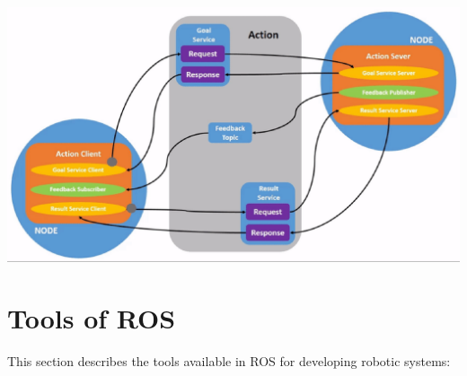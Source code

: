 \begin{itemize}
	\begin{center}
		\captionsetup{type=figure}
		\includegraphics[width=0.6\linewidth]{img/Action.png}
	\end{center}
\end{itemize}
\section{Tools of ROS}
This section describes the tools available in ROS for developing robotic systems:
